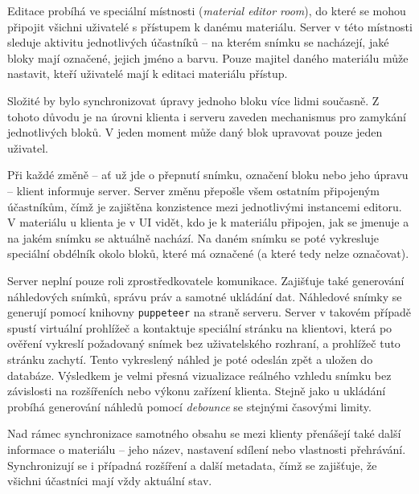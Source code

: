Editace probíhá ve speciální místnosti (\textit{material editor room}), do které se mohou připojit všichni uživatelé s přístupem k danému materiálu. 
Server v této místnosti sleduje aktivitu jednotlivých účastníků -- na kterém snímku se nacházejí, jaké bloky mají označené, jejich jméno a barvu. 
Pouze majitel daného materiálu může nastavit, kteří uživatelé mají k editaci materiálu přístup.

Složité by bylo synchronizovat úpravy jednoho bloku více lidmi současně.
Z tohoto důvodu je na úrovni klienta i serveru zaveden mechanismus pro zamykání jednotlivých bloků.
V jeden moment může daný blok upravovat pouze jeden uživatel.

Při každé změně -- ať už jde o přepnutí snímku, označení bloku nebo jeho úpravu -- klient informuje server. 
Server změnu přepošle všem ostatním připojeným účastníkům, čímž je zajištěna konzistence mezi jednotlivými instancemi editoru.
V materiálu u klienta je v UI vidět, kdo je k materiálu připojen, jak se jmenuje a na jakém snímku se aktuálně nachází.
Na daném snímku se poté vykresluje speciální obdélník okolo bloků, které má označené (a které tedy nelze označovat).

Server neplní pouze roli zprostředkovatele komunikace. 
Zajišťuje také generování náhledových snímků, správu práv a samotné ukládání dat.
Náhledové snímky se generují pomocí knihovny \texttt{puppeteer} na straně serveru. 
Server v takovém případě spustí virtuální prohlížeč a kontaktuje speciální stránku na klientovi, která po ověření vykreslí požadovaný snímek bez uživatelského rozhraní, a prohlížeč tuto stránku zachytí. 
Tento vykreslený náhled je poté odeslán zpět a uložen do databáze. 
Výsledkem je velmi přesná vizualizace reálného vzhledu snímku bez závislosti na rozšířeních nebo výkonu zařízení klienta.
Stejně jako u ukládání probíhá generování náhledů pomocí \textit{debounce} se stejnými časovými limity.

Nad rámec synchronizace samotného obsahu se mezi klienty přenášejí také další informace o materiálu -- jeho název, nastavení sdílení nebo vlastnosti přehrávání.
Synchronizují se i případná rozšíření a další metadata, čímž se zajišťuje, že všichni účastníci mají vždy aktuální stav.



